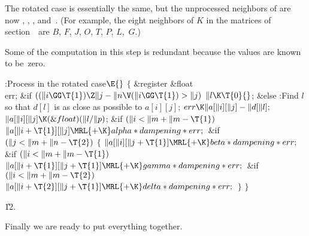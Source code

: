 The rotated case is essentially the same, but the unprocessed
neighbors of  are now , , ,
and~. (For example, the eight neighbors of $K$
in
the matrices of section~\matrixsec\ are $B$, $F$, $J$, $O$, $T$, $P$,
$L$,~$G$.)

Some of the computation in this step is redundant because the values
are known to be~zero.

\Y\B\4:Process  in the rotated case\X${}\E{}$\6
${}\{{}$\5
\1\&{register} \&{float} \\{err};\7
\&{if} ${}((\|i\GG\T{1})\Z\|j-\|n\V(\|i\GG\T{1})>\|j){}$\1\5
${}\|l\K\T{0}{}$;\2\6
\&{else}\1\5
:Find $l$ so that $d[l]$ is as close as possible to $a[i][j]$\X;\2\6
${}\\{err}\K\|a[\|i][\|j]-\|d[\|l];{}$\6
${}\|a[\|i][\|j]\K(\&{float})(\|l/\|p){}$;\6
\&{if} ${}(\|i<\|m+\|m-\T{1}){}$\1\5
${}\|a[\|i+\T{1}][\|j]\MRL{+{\K}}\\{alpha}*\\{dampening}*\\{err};{}$\2\6
\&{if} ${}(\|j<\|m+\|n-\T{2}){}$\5
${}\{{}$\1\6
${}\|a[\|i][\|j+\T{1}]\MRL{+{\K}}\\{beta}*\\{dampening}*\\{err};{}$\6
\&{if} ${}(\|i<\|m+\|m-\T{1}){}$\1\5
${}\|a[\|i+\T{1}][\|j+\T{1}]\MRL{+{\K}}\\{gamma}*\\{dampening}*\\{err};{}$\2\6
\&{if} ${}(\|i<\|m+\|m-\T{2}){}$\1\5
${}\|a[\|i+\T{2}][\|j+\T{1}]\MRL{+{\K}}\\{delta}*\\{dampening}*\\{err};{}$\2\6
\4${}\}{}$\2\6
\4${}\}{}$\2\par
\U12.\fi

Finally we are ready to put everything together.

